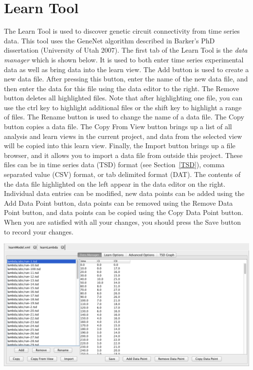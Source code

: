 \documentclass[titlepage,11pt]{article}
\begin{document}
\clearpage

\section{\label{Learn}Learn Tool}

\noindent
The Learn Tool is used to discover genetic circuit connectivity from time series data.  This tool uses the GeneNet algorithm described in
Barker's PhD dissertation (University of Utah 2007).
  The first tab of the Learn Tool is the \emph{data manager} which is shown below.  It is used to both enter time series experimental data as well as bring data into the learn view.  The Add button is used to create a new data file. After pressing this button, enter the name of the new data file, and then enter the data for this file using the data editor to the right.  The Remove button deletes all highlighted files.  Note that after highlighting one file, you can use the ctrl key to highlight additional files or the shift key to highlight a range of files.  The Rename button is used to change the name of a data file. The Copy button copies a data file. The Copy From View button brings up a list of all analysis and learn views in the current project, and data from the selected view will be copied into this learn view.  Finally, the Import button brings up a file browser, and it allows you to import a data file from outside
this project.  These files can be in time series data (TSD) format (see Section~\ref{TSD}), comma separated value (CSV) format, or tab delimited format (DAT).  
The contents of the data file highlighted on the left appear in the data editor on the right.  Individual data entries can be modified, new data points can be added using the Add Data Point button, data points can be removed using the Remove Data Point button, and data points can be copied using the Copy Data Point button.  When you are
satisfied with all your changes, you should press the Save button to record your changes.

\begin{center}
\includegraphics[width=160mm]{screenshots/dataManager}
\end{center}
\end{document}
